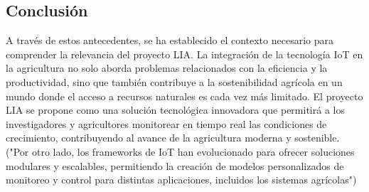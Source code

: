 \subsection{Conclusión}
A través de estos antecedentes, se ha establecido el contexto necesario para comprender la relevancia del proyecto LIA. La integración de la tecnología IoT en la agricultura no solo aborda problemas relacionados con la eficiencia y la productividad, sino que también contribuye a la sostenibilidad agrícola en un mundo donde el acceso a recursos naturales es cada vez más limitado. El proyecto LIA se propone como una solución tecnológica innovadora que permitirá a los investigadores y agricultores monitorear en tiempo real las condiciones de crecimiento, contribuyendo al avance de la agricultura moderna y sostenible.
("Por otro lado, los frameworks de IoT han evolucionado para ofrecer soluciones modulares y escalables, permitiendo la creación de modelos personalizados de monitoreo y control para distintas aplicaciones, incluidos los sistemas agrícolas") \cite{lopez2020, fernandez2021}
